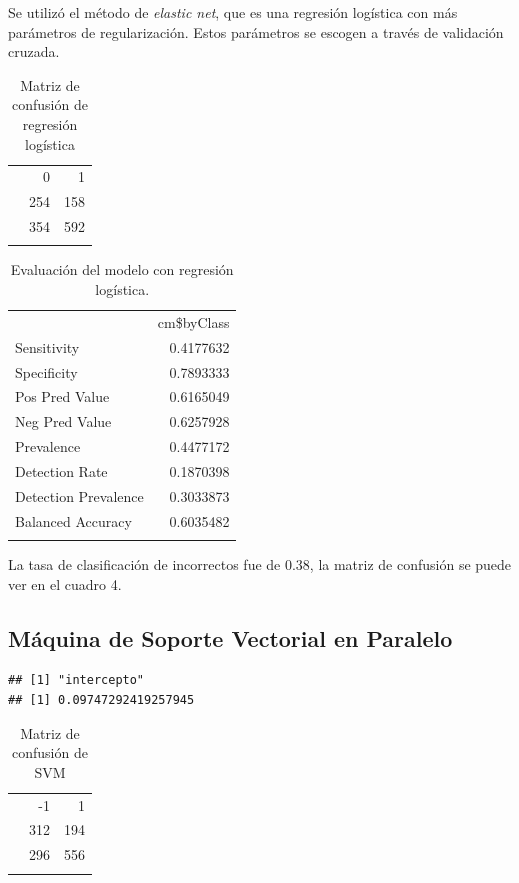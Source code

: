 \documentclass[]{article}
\begin{document}
Se utilizó el método de \emph{elastic net}, que es una regresión
logística con más parámetros de regularización. Estos parámetros se
escogen a través de validación cruzada.

\begin{longtable}[c]{@{}lrr@{}}
\toprule\addlinespace
& 0 & 1
\\\addlinespace
\midrule\endhead
0 & 254 & 158
\\\addlinespace
1 & 354 & 592
\\\addlinespace
\bottomrule
\addlinespace
\caption{Matriz de confusión de regresión logística}
\end{longtable}

\begin{longtable}[c]{@{}lr@{}}
\toprule\addlinespace
& cm\$byClass
\\\addlinespace
\midrule\endhead
Sensitivity & 0.4177632
\\\addlinespace
Specificity & 0.7893333
\\\addlinespace
Pos Pred Value & 0.6165049
\\\addlinespace
Neg Pred Value & 0.6257928
\\\addlinespace
Prevalence & 0.4477172
\\\addlinespace
Detection Rate & 0.1870398
\\\addlinespace
Detection Prevalence & 0.3033873
\\\addlinespace
Balanced Accuracy & 0.6035482
\\\addlinespace
\bottomrule
\addlinespace
\caption{Evaluación del modelo con regresión logística.}
\end{longtable}

La tasa de clasificación de incorrectos fue de 0.38, la matriz de
confusión se puede ver en el cuadro 4.

\pagebreak 

\subsection{Máquina de Soporte Vectorial en
Paralelo}\label{maquina-de-soporte-vectorial-en-paralelo}

\begin{verbatim}
## [1] "intercepto"
## [1] 0.09747292419257945
\end{verbatim}

\begin{longtable}[c]{@{}lrr@{}}
\toprule\addlinespace
& -1 & 1
\\\addlinespace
\midrule\endhead
-1 & 312 & 194
\\\addlinespace
1 & 296 & 556
\\\addlinespace
\bottomrule
\addlinespace
\caption{Matriz de confusión de SVM}
\end{longtable}
\end{document}
